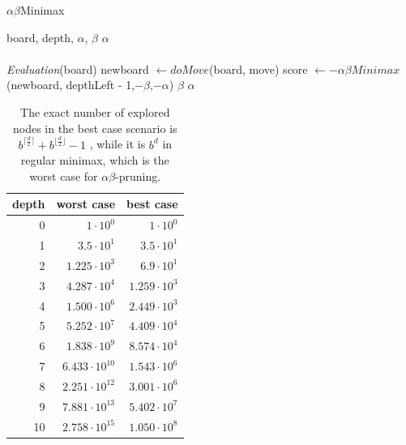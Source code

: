 \begin{algorithm}
\caption{$\alpha \beta$Minimax}
\label{al:alphabeta}
\begin{algorithmic}[]
\REQUIRE board, depth, $\alpha$, $\beta$
\ENSURE $\alpha$\\
 \\
\RETURN \textit{Evaluation}(board) 
\ENDIF
{}
\STATE newboard $\leftarrow doMove$(board, move)
\STATE score $\leftarrow -\alpha \beta Minimax$(newboard, depthLeft - 1,$-\beta$,$-\alpha$)
\RETURN $\beta$
\ENDIF
{}
\ENDIF
\ENDFOR
\RETURN $\alpha$
\end{algorithmic}
\end{algorithm}

\begin{table}[]
\centering
\caption[Comparison $\alpha\beta$-pruning and regular minimax]{The exact number of explored nodes in the best case scenario is $b^{\lceil \frac{d}{2} \rceil}+b^{\lfloor \frac{d}{2} \rfloor}-1 $ \cite{edw61}, while it is $b^{d}$ in regular minimax, which is the worst case for $\alpha \beta$-pruning.}
\label{tab:alphabeta}
\begin{tabular}{rrr}
\toprule
\textbf{depth} & \textbf{worst case} & \textbf{best case} \\
\midrule
0              & $1 \cdot 10^0$                   & $1\cdot 10^0$                  \\
1              & $3.5\cdot 10^1$                & $3.5\cdot 10^1$                 \\
2              & $1.225\cdot 10^3$                & $6.9\cdot 10^1$                 \\
3              & $4.287 \cdot 10^4$  			& $1.259\cdot 10^3$               \\
4              & $1.500\cdot 10^6$             & $2.449\cdot 10^3$               \\
5              & $5.252\cdot 10^7$            & $4.409\cdot 10^4$              \\
6              & $1.838\cdot 10^9$          & $8.574\cdot 10^4$              \\
7              & $6.433\cdot 10^{10}$         & $1.543\cdot 10^6$            \\
8              & $2.251\cdot 10^{12}$       & $3.001\cdot 10^6$            \\
9              & $7.881\cdot 10^{13}$      & $5.402\cdot 10^7$           \\
10             & $2.758\cdot 10^{15}$    & $1.050\cdot 10^8$          \\
\bottomrule
\end{tabular}
\end{table}

